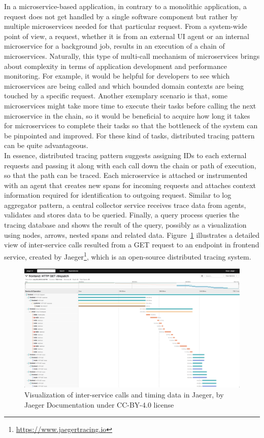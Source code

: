 \documentclass{Configuration_Files/PoliMi3i_thesis}
\begin{document}
In a microservice-based application, in contrary to a monolithic application, a request does not get handled by a single software component but rather by multiple microservices needed for that particular request.
From a system-wide point of view, a request, whether it is from an external UI agent or an internal microservice for a background job, results in an execution of a chain of microservices.
Naturally, this type of multi-call mechanism of microservices brings about complexity in terms of application development and performance monitoring.
For example, it would be helpful for developers to see which microservices are being called and which bounded domain contexts are being touched by a specific request.
Another exemplary scenario is that, some microservices might take more time to execute their tasks before calling the next microservice in the chain, so it would be beneficial to acquire how long it takes for microservices to complete their tasks so that the bottleneck of the system can be pinpointed and improved.
For these kind of tasks, distributed tracing pattern can be quite advantageous.
\\
In essence, distributed tracing pattern suggests assigning IDs to each external requests and passing it along with each call down the chain or path of execution, so that the path can be traced.
Each microservice is attached or instrumented with an agent that creates new spans for incoming requests and attaches context information required for identification to outgoing request.
Similar to log aggregator pattern, a central collector service receives trace data from agents, validates and stores data to be queried.
Finally, a query process queries the tracing database and shows the result of the query, possibly as a visualization using nodes, arrows, nested spans and related data.
Figure~\ref{fig:jaeger_trace} illustrates a detailed view of inter-service calls resulted from a GET request to an endpoint in frontend service, created by Jaeger\footnote{\href{https://www.jaegertracing.io}{https://www.jaegertracing.io}}, which is an open-source distributed tracing system.

\begin{figure}[H]
\centering
\includegraphics[width=1.0\textwidth]{myImages/trace-detail-ss.png}
\caption{Visualization of inter-service calls and timing data in Jaeger, by Jaeger Documentation under CC-BY-4.0 license}
\label{fig:jaeger_trace}
\end{figure}
\end{document}
